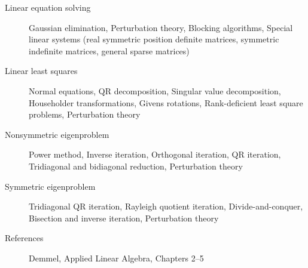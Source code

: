 \documentclass{article}
\begin{document}
\begin{description}
\item[Linear equation solving] Gaussian elimination, Perturbation theory, Blocking algorithms, Special linear systems (real symmetric position definite matrices, symmetric indefinite matrices, general sparse matrices)

\item[Linear least squares] Normal equations, QR decomposition, Singular value decomposition, Householder transformations, Givens rotations, Rank-deficient least square problems, Perturbation theory

\item[Nonsymmetric eigenproblem] Power method, Inverse iteration, Orthogonal iteration, QR iteration, Tridiagonal and bidiagonal reduction, Perturbation theory

\item[Symmetric eigenproblem] Tridiagonal QR iteration, Rayleigh quotient iteration, Divide-and-conquer, Bisection and inverse iteration, Perturbation theory

\item[References] Demmel, Applied Linear Algebra, Chapters 2--5
\end{description}
\end{document}
